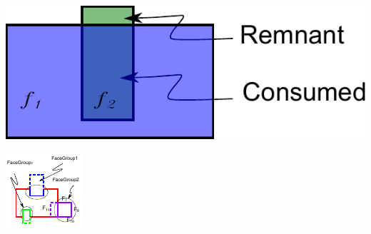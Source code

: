 \begin{minipage}{0.9\textwidth}

\begin{minipage}[c]{0.33\linewidth}
\includegraphics[width=\linewidth,valign=t]{../Common/images/Solid_Simple_SmallProtrusion.pdf}
 \label{fig_remnant}
\end{minipage}
\hfill
\begin{minipage}[c]{0.3\linewidth}
\includegraphics[width=0.8\linewidth,valign=t]{../Common/images/facegroups.pdf}
 \label{fig_clusters}
\end{minipage}

\end{minipage}
